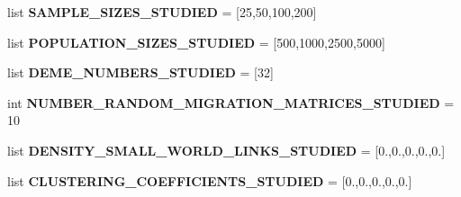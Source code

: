 \begin{DoxyCompactItemize}
\item 
\hypertarget{classctpy_1_1utils_1_1configuration_1_1_c_t_py_configuration_aaac008492674f70791c1176e39746b7c}{list {\bfseries S\-A\-M\-P\-L\-E\-\_\-\-S\-I\-Z\-E\-S\-\_\-\-S\-T\-U\-D\-I\-E\-D} = \mbox{[}25,50,100,200\mbox{]}}\label{classctpy_1_1utils_1_1configuration_1_1_c_t_py_configuration_aaac008492674f70791c1176e39746b7c}

\item 
\hypertarget{classctpy_1_1utils_1_1configuration_1_1_c_t_py_configuration_a1dafedca7d79e57ba40c9c576143900e}{list {\bfseries P\-O\-P\-U\-L\-A\-T\-I\-O\-N\-\_\-\-S\-I\-Z\-E\-S\-\_\-\-S\-T\-U\-D\-I\-E\-D} = \mbox{[}500,1000,2500,5000\mbox{]}}\label{classctpy_1_1utils_1_1configuration_1_1_c_t_py_configuration_a1dafedca7d79e57ba40c9c576143900e}

\item 
\hypertarget{classctpy_1_1utils_1_1configuration_1_1_c_t_py_configuration_a32fdaa7016b928746886eb1171042ea5}{list {\bfseries D\-E\-M\-E\-\_\-\-N\-U\-M\-B\-E\-R\-S\-\_\-\-S\-T\-U\-D\-I\-E\-D} = \mbox{[}32\mbox{]}}\label{classctpy_1_1utils_1_1configuration_1_1_c_t_py_configuration_a32fdaa7016b928746886eb1171042ea5}

\item 
\hypertarget{classctpy_1_1utils_1_1configuration_1_1_c_t_py_configuration_ab3f4b06e4d980c7213fe2cdf9af4ee21}{int {\bfseries N\-U\-M\-B\-E\-R\-\_\-\-R\-A\-N\-D\-O\-M\-\_\-\-M\-I\-G\-R\-A\-T\-I\-O\-N\-\_\-\-M\-A\-T\-R\-I\-C\-E\-S\-\_\-\-S\-T\-U\-D\-I\-E\-D} = 10}\label{classctpy_1_1utils_1_1configuration_1_1_c_t_py_configuration_ab3f4b06e4d980c7213fe2cdf9af4ee21}

\item 
\hypertarget{classctpy_1_1utils_1_1configuration_1_1_c_t_py_configuration_a1732fed6532f6791470984c6aa93b5b3}{list {\bfseries D\-E\-N\-S\-I\-T\-Y\-\_\-\-S\-M\-A\-L\-L\-\_\-\-W\-O\-R\-L\-D\-\_\-\-L\-I\-N\-K\-S\-\_\-\-S\-T\-U\-D\-I\-E\-D} = \mbox{[}0.,0.,0.,0.,0.\mbox{]}}\label{classctpy_1_1utils_1_1configuration_1_1_c_t_py_configuration_a1732fed6532f6791470984c6aa93b5b3}

\item 
\hypertarget{classctpy_1_1utils_1_1configuration_1_1_c_t_py_configuration_a447666e9624d05209a6f0895b50a4225}{list {\bfseries C\-L\-U\-S\-T\-E\-R\-I\-N\-G\-\_\-\-C\-O\-E\-F\-F\-I\-C\-I\-E\-N\-T\-S\-\_\-\-S\-T\-U\-D\-I\-E\-D} = \mbox{[}0.,0.,0.,0.,0.\mbox{]}}\label{classctpy_1_1utils_1_1configuration_1_1_c_t_py_configuration_a447666e9624d05209a6f0895b50a4225}


\end{DoxyCompactItemize}
